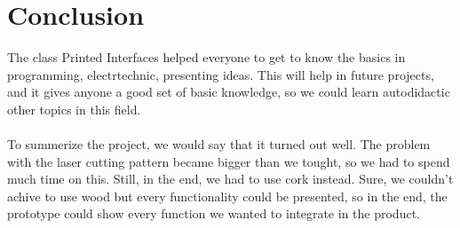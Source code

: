 \documentclass[00_doc.tex]{subfiles}
\begin{document}
    \section{Conclusion}
    \begin{flushleft}
        The class Printed Interfaces helped everyone to get to know the basics in programming,
        electrtechnic, presenting ideas. This will help in future projects, and it gives anyone 
        a good set of basic knowledge, so we could learn autodidactic other topics in this field.\\~\\

        To summerize the project, we would say that it turned out well. The problem with the laser 
        cutting pattern became bigger than we tought, so we had to spend much time on this. Still, 
        in the end, we had to use cork instead. Sure, we couldn't achive to use wood but every 
        functionality could be presented, so in the end, the prototype could show every function we 
        wanted to integrate in the product.
    \end{flushleft}
\end{document}
